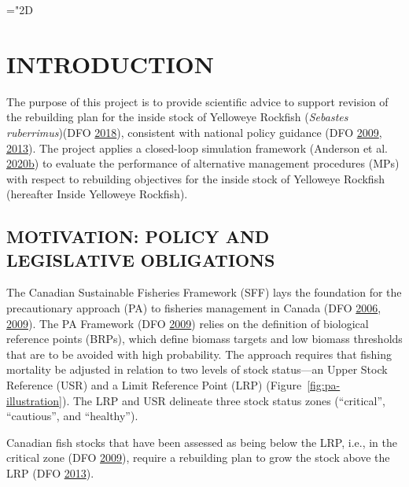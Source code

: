 \documentclass[11pt]{book}
\begin{document}
\frontmatter

\newcommand{\lt}{\ensuremath <}
\newcommand{\gt}{\ensuremath >}

\mathchardef\mhyphen="2D

\clearpage

\hypertarget{sec:introduction}{%
\section{INTRODUCTION}\label{sec:introduction}}

The purpose of this project is to provide scientific advice to support revision of the rebuilding plan for the inside stock of Yelloweye Rockfish (\emph{Sebastes ruberrimus})(DFO \protect\hyperlink{ref-ifmp2018}{2018}), consistent with national policy guidance (DFO \protect\hyperlink{ref-dfo2009}{2009}, \protect\hyperlink{ref-dfo2013}{2013}). The project applies a closed-loop simulation framework (Anderson et al. \protect\hyperlink{ref-anderson2020gfmp}{2020}\protect\hyperlink{ref-anderson2020gfmp}{b}) to evaluate the performance of alternative management procedures (MPs) with respect to rebuilding objectives for the inside stock of Yelloweye Rockfish (hereafter Inside Yelloweye Rockfish).

\hypertarget{sec:introduction-motivation}{%
\subsection{MOTIVATION: POLICY AND LEGISLATIVE OBLIGATIONS}\label{sec:introduction-motivation}}

The Canadian Sustainable Fisheries Framework (SFF) lays the foundation for the precautionary approach (PA) to fisheries management in Canada (DFO \protect\hyperlink{ref-dfo2006}{2006}, \protect\hyperlink{ref-dfo2009}{2009}). The PA Framework (DFO \protect\hyperlink{ref-dfo2009}{2009}) relies on the definition of biological reference points (BRPs), which define biomass targets and low biomass thresholds that are to be avoided with high probability. The approach requires that fishing mortality be adjusted in relation to two levels of stock status---an Upper Stock Reference (USR) and a Limit Reference Point (LRP) (Figure~\ref{fig:pa-illustration}). The LRP and USR delineate three stock status zones (``critical'', ``cautious'', and ``healthy'').

Canadian fish stocks that have been assessed as being below the LRP, i.e., in the critical zone (DFO \protect\hyperlink{ref-dfo2009}{2009}), require a rebuilding plan to grow the stock above the LRP (DFO \protect\hyperlink{ref-dfo2013}{2013}).
\end{document}
